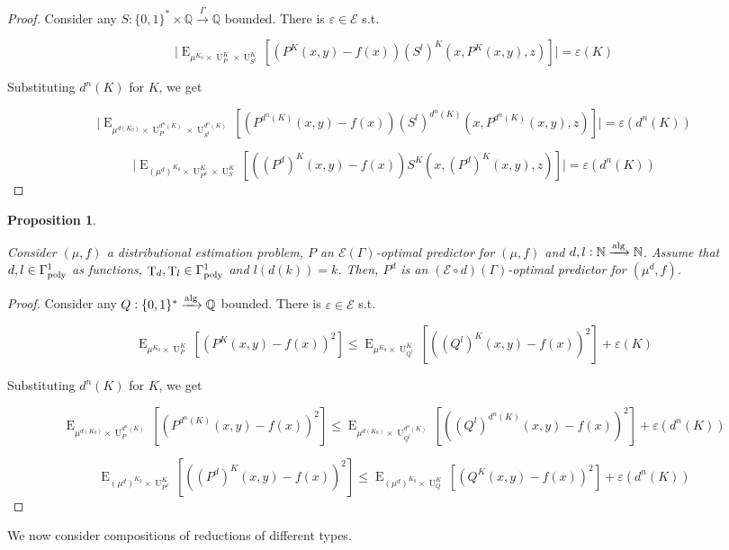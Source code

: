 \documentclass{article}
\numberwithin{equation}{section}
\theoremstyle{definition}
\theoremstyle{plain}
\newtheorem{proposition}{Proposition}[section]
\newcommand{\Bool}{\{0,1\}}
\newcommand{\Words}{{\Bool^*}}
\DeclareMathOperator{\E}{E}
\DeclareMathOperator{\T}{T}
\DeclareMathOperator{\Un}{U}
\newcommand{\Nats}{\mathbb{N}}
\newcommand{\Rats}{\mathbb{Q}}
\newcommand{\Abs}[1]{\lvert #1 \rvert}
\newcommand{\Fall}{\mathcal{E}}
\newcommand{\EG}{\Fall(\Gamma)}
\newcommand{\Alg}{\xrightarrow{\textnormal{alg}}}
\newcommand{\Scheme}{\xrightarrow{\Gamma}}
\begin{document}
\begin{proof}

Consider any ${S: \Words \times \Rats \Scheme \Rats}$ bounded. There is ${\varepsilon \in \Fall}$ s.t.

\[\Abs{\E_{\mu^{K_0} \times \Un_P^K \times \Un_{S^l}^K}[(P^K(x,y) - f(x))(S^l)^K(x,P^K(x,y),z)]}=\varepsilon(K)\]

Substituting ${d^n(K)}$ for ${K}$, we get

\[\Abs{\E_{\mu^{d(K_0)} \times \Un_P^{d^n(K)} \times \Un_{S^l}^{d^n(K)}}[(P^{d^n(K)}(x,y) - f(x))(S^l)^{d^n(K)}(x,P^{d^n(K)}(x,y),z)]}=\varepsilon(d^n(K))\]

\[\Abs{\E_{(\mu^d)^{K_0} \times \Un_{P^d}^{K} \times \Un_{S}^{K}}[((P^d)^{K}(x,y) - f(x))S^{K}(x,(P^d)^{K}(x,y),z)]}=\varepsilon(d^n(K))\]
%
\end{proof}

\begin{samepage}
\begin{proposition}
\label{prp:idx_reduce}

Consider $(\mu,f)$ a distributional estimation problem, ${P}$ an ${\EG}$-optimal predictor for ${(\mu,f)}$ and ${d,l: \Nats \Alg \Nats}$. Assume that ${d,l \in \Gamma_{\textnormal{poly}}^1}$ as functions, ${\T_d, \T_l \in \Gamma_{\textnormal{poly}}^1}$ and ${l(d(k))=k}$. Then, ${P^d}$ is an ${(\Fall \circ d)(\Gamma)}$-optimal predictor for ${(\mu^d,f)}$.

\end{proposition}
\end{samepage}

\begin{proof}

Consider any ${Q: \Words \Alg \Rats}$ bounded. There is ${\varepsilon \in \Fall}$ s.t.

\[\E_{\mu^{K_0} \times \Un_P^K}[(P^K(x,y)-f(x))^2] \leq \E_{\mu^{K_0} \times \Un_{Q^l}^K}[((Q^l)^K(x,y)-f(x))^2] + \varepsilon(K)\]

Substituting ${d^n(K)}$ for ${K}$, we get

\[\E_{\mu^{d(K_0)} \times \Un_P^{d^n(K)}}[(P^{d^n(K)}(x,y)-f(x))^2] \leq \E_{\mu^{d(K_0)} \times \Un_{Q^l}^{d^n(K)}}[((Q^l)^{d^n(K)}(x,y)-f(x))^2] + \varepsilon({d^n(K)})\]

\[\E_{(\mu^d)^{K_0} \times \Un_{P^d}^K}[((P^d)^K(x,y)-f(x))^2] \leq \E_{(\mu^d)^{K_0} \times \Un_Q^K}[(Q^K(x,y)-f(x))^2] + \varepsilon(d^n(K))\]
%
\end{proof}

We now consider compositions of reductions of different types.
\end{document}
